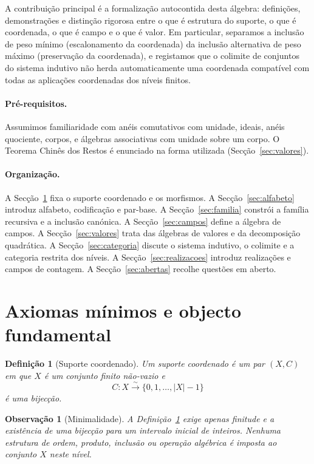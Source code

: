 \documentclass[11pt,a4paper]{article}
\newtheorem{definicao}{Definição}
\newtheorem{observacao}{Observação}
\begin{document}
A contribuição principal é a formalização autocontida desta álgebra:
definições, demonstrações e distinção rigorosa entre o que é estrutura do
suporte, o que é coordenada, o que é campo e o que é valor.
Em particular, separamos a inclusão de peso mínimo (escalonamento da
coordenada) da inclusão alternativa de peso máximo (preservação da
coordenada), e registamos que o colimite de conjuntos do sistema indutivo
não herda automaticamente uma coordenada compatível com todas as aplicações
coordenadas dos níveis finitos.

\paragraph{Pré-requisitos.}
Assumimos familiaridade com anéis comutativos com unidade, ideais, anéis
quociente, corpos, e álgebras associativas com unidade sobre um corpo.
O Teorema Chinês dos Restos é enunciado na forma utilizada
(Secção~\ref{sec:valores}).

\paragraph{Organização.}
A Secção~\ref{sec:axiomas} fixa o suporte coordenado e os morfismos.
A Secção~\ref{sec:alfabeto} introduz alfabeto, codificação e par-base.
A Secção~\ref{sec:familia} constrói a família recursiva e a inclusão canónica.
A Secção~\ref{sec:campos} define a álgebra de campos.
A Secção~\ref{sec:valores} trata das álgebras de valores e da decomposição
quadrática.
A Secção~\ref{sec:categoria} discute o sistema indutivo, o colimite e a
categoria restrita dos níveis.
A Secção~\ref{sec:realizacoes} introduz realizações e campos de contagem.
A Secção~\ref{sec:abertas} recolhe questões em aberto.

\section{Axiomas mínimos e objecto fundamental}
\label{sec:axiomas}

\begin{definicao}[Suporte coordenado]
\label{def:suporte-coordenado}
Um \emph{suporte coordenado} é um par \((X,C)\) em que \(X\) é um conjunto
finito não-vazio e
\[
C\colon X\overset{\sim}{\longrightarrow}\{0,1,\dots,\lvert X\rvert-1\}
\]
é uma bijecção.
\end{definicao}

\begin{observacao}[Minimalidade]
\label{obs:minimalidade}
A Definição~\ref{def:suporte-coordenado} exige apenas finitude e a existência
de uma bijecção para um intervalo inicial de inteiros.
Nenhuma estrutura de ordem, produto, inclusão ou operação algébrica é
imposta ao conjunto \(X\) neste nível.
\end{observacao}
\end{document}
